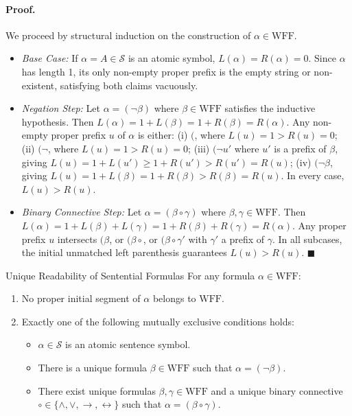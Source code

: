 \paragraph{Proof.}
We proceed by structural induction on the construction of $\alpha \in \mathrm{WFF}$.
\begin{itemize}[leftmargin=1.4em,itemsep=3pt]
  \item \textit{Base Case:} If $\alpha = A \in \mathcal{S}$ is an atomic symbol, $L(\alpha) = R(\alpha) = 0$. Since $\alpha$ has length 1, its only non-empty proper prefix is the empty string or non-existent, satisfying both claims vacuously.
  \item \textit{Negation Step:} Let $\alpha = (\neg \beta)$ where $\beta \in \mathrm{WFF}$ satisfies the inductive hypothesis. Then $L(\alpha) = 1 + L(\beta) = 1 + R(\beta) = R(\alpha)$. Any non-empty proper prefix $u$ of $\alpha$ is either:
  (i) $($, where $L(u)=1 > R(u)=0$;
  (ii) $(\neg$, where $L(u)=1 > R(u)=0$;
  (iii) $(\neg u'$ where $u'$ is a prefix of $\beta$, giving $L(u) = 1 + L(u') \ge 1 + R(u') > R(u') = R(u)$;
  (iv) $(\neg \beta$, giving $L(u) = 1 + L(\beta) = 1 + R(\beta) > R(\beta) = R(u)$. In every case, $L(u) > R(u)$.
  \item \textit{Binary Connective Step:} Let $\alpha = (\beta \circ \gamma)$ where $\beta, \gamma \in \mathrm{WFF}$. Then $L(\alpha) = 1 + L(\beta) + L(\gamma) = 1 + R(\beta) + R(\gamma) = R(\alpha)$. Any proper prefix $u$ intersects $(\beta$, or $(\beta\circ$, or $(\beta\circ \gamma'$ with $\gamma'$ a prefix of $\gamma$. In all subcases, the initial unmatched left parenthesis guarantees $L(u) > R(u)$. $\blacksquare$
\end{itemize}

\begin{theorembox}{Unique Readability of Sentential Formulas}
For any formula $\alpha \in \mathrm{WFF}$:
\begin{enumerate}[leftmargin=1.4em,itemsep=2pt]
  \item No proper initial segment of $\alpha$ belongs to $\mathrm{WFF}$.
  \item Exactly one of the following mutually exclusive conditions holds:
  \begin{itemize}[leftmargin=1.2em,itemsep=1pt]
    \item $\alpha \in \mathcal{S}$ is an atomic sentence symbol.
    \item There is a unique formula $\beta \in \mathrm{WFF}$ such that $\alpha = (\neg \beta)$.
    \item There exist unique formulas $\beta, \gamma \in \mathrm{WFF}$ and a unique binary connective $\circ \in \{\land, \lor, \to, \leftrightarrow\}$ such that $\alpha = (\beta \circ \gamma)$.
  \end{itemize}
\end{enumerate}
\end{theorembox}

